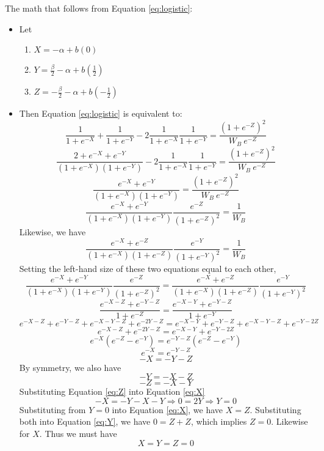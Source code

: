 \documentclass[12pt]{article}
\begin{document}
\newpage
The math that follows from Equation \ref{eq:logistic}:
\begin{itemize}
	\item Let
		\begin{enumerate}
			\item $X = -\alpha + b(0)$ 
			\item $Y = \frac{\beta}{2} - \alpha + b\left(\frac{1}{2}\right)$
			\item $Z = -\frac{\beta}{2} - \alpha + b\left(-\frac{1}{2}\right)$
		\end{enumerate}
	\item Then Equation \ref{eq:logistic} is equivalent to:
		\begin{equation}
			\frac{1}{1+e^{-X}} + \frac{1}{1+e^{-Y}} - 2\frac{1}{1+e^{-X}}  \frac{1}{1+e^{-Y}} = \frac{\left(1+e^{-Z}\right)^2}{W_B \: e^{-Z} }
					\label{eq:logistic2}
		\end{equation}
		\[
			\frac{2 + e^{-X} + e^{-Y}}{\left(1+e^{-X}\right)\left(1+e^{-Y}\right)} - 2\frac{1}{1+e^{-X}}  \frac{1}{1+e^{-Y}} = \frac{\left(1+e^{-Z}\right)^2}{W_B \: e^{-Z}}
		\]
		\[
			\frac{e^{-X} + e^{-Y}}{\left(1+e^{-X}\right)\left(1+e^{-Y}\right)} = \frac{\left(1+e^{-Z}\right)^2}{W_B \: e^{-Z}}
		\]
		\begin{equation}
			\frac{e^{-X} + e^{-Y}}{\left(1+e^{-X}\right)\left(1+e^{-Y}\right)} \frac{e^{-Z}}{\left(1+e^{-Z}\right)^2}= \frac{1}{W_B}
		\end{equation}
		Likewise, we have
		\begin{equation}
			\frac{e^{-X} + e^{-Z}}{\left(1+e^{-X}\right)\left(1+e^{-Z}\right)} \frac{e^{-Y}}{\left(1+e^{-Y}\right)^2}= \frac{1}{W_B}
		\end{equation}
		Setting the left-hand size of these two equations equal to each other,
		\[
		  \frac{e^{-X} + e^{-Y}}{\left(1+e^{-X}\right)\left(1+e^{-Y}\right)} \frac{e^{-Z}}{\left(1+e^{-Z}\right)^2}= \frac{e^{-X} + e^{-Z}}{\left(1+e^{-X}\right)\left(1+e^{-Z}\right)} \frac{e^{-Y}}{\left(1+e^{-Y}\right)^2}
		\]
		\[
		  \frac{e^{-X-Z} + e^{-Y-Z}}{1+e^{-Z}}= \frac{e^{-X-Y} + e^{-Y-Z}}{1+e^{-Y}}
		\]
		\[
		  e^{-X-Z} + e^{-Y-Z} + e^{-X-Y-Z} +e^{-2Y-Z}= e^{-X-Y} + e^{-Y-Z} + e^{-X-Y-Z} +e^{-Y-2Z}
		\]
		\[
		  e^{-X-Z} +e^{-2Y-Z}= e^{-X-Y} +e^{-Y-2Z}
		\]
		\[
		  e^{-X}\left(e^{-Z} - e^{-Y} \right) = e^{-Y-Z}\left(e^{-Z} - e^{-Y} \right)
		\]
		\[
		  e^{-X} = e^{-Y-Z}
		\]
		\begin{equation}
		  -X = -Y-Z
			\label{eq:X}
		\end{equation}
		By symmetry, we also have
		\begin{equation}
		  -Y = -X - Z
			\label{eq:Y}
		\end{equation}
		\begin{equation}
		  -Z = -X - Y
			\label{eq:Z}
		\end{equation}
		Substituting Equation \ref{eq:Z} into Equation \ref{eq:X}
		\[
		  - X = - Y - X - Y \Rightarrow 0 = 2Y \Rightarrow Y = 0
		\]
		Substituting from $Y = 0$ into Equation \ref{eq:X}, we have $X = Z$. Substituting both into Equation \ref{eq:Y}, we have $0 = Z + Z$, which implies $Z = 0$. Likewise for $X$. Thus we must have
		\[
		  X = Y = Z = 0
		\]		
\end{itemize}		
\end{document}
